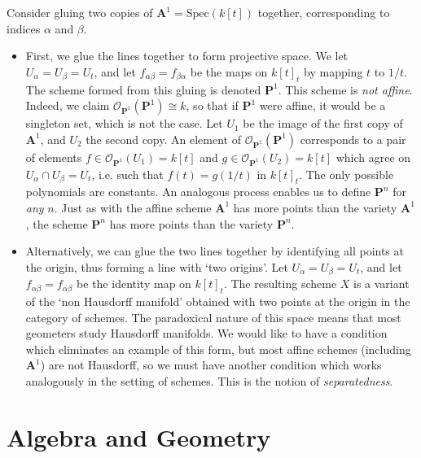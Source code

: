 \begin{example}
    Consider gluing two copies of $\mathbf{A}^1 = \text{Spec}(k[t])$ together, corresponding to indices $\alpha$ and $\beta$.
    \begin{itemize}
        \item First, we glue the lines together to form projective space. We let $U_\alpha = U_\beta = U_t$, and let $f_{\alpha \beta} = f_{\beta \alpha}$ be the maps on $k[t]_t$ by mapping $t$ to $1/t$. The scheme formed from this gluing is denoted $\mathbf{P}^1$. This scheme is \emph{not affine}. Indeed, we claim $\mathcal{O}_{\mathbf{P}^1}(\mathbf{P}^1) \cong k$, so that if $\mathbf{P}^1$ were affine, it would be a singleton set, which is not the case. Let $U_1$ be the image of the first copy of $\mathbf{A}^1$, and $U_2$ the second copy. An element of $\mathcal{O}_{\mathbf{P}^1}(\mathbf{P}^1)$ corresponds to a pair of elements $f \in \mathcal{O}_{\mathbf{P}^1}(U_1) = k[t]$ and $g \in \mathcal{O}_{\mathbf{P}^1}(U_2) = k[t]$ which agree on $U_\alpha \cap U_\beta = U_t$, i.e. such that $f(t) = g(1/t)$ in $k[t]_t$. The only possible polynomials are constants. An analogous process enables us to define $\mathbf{P}^n$ for \emph{any} $n$. Just as with the affine scheme $\mathbf{A}^1$ has more points than the variety $\mathbf{A}^1$, the scheme $\mathbf{P}^n$ has more points than the variety $\mathbf{P}^n$.

        \item Alternatively, we can glue the two lines together by identifying all points at the origin, thus forming a line with `two origins'. Let $U_\alpha = U_\beta = U_t$, and let $f_{\alpha \beta} = f_{\alpha \beta}$ be the identity map on $k[t]_t$. The resulting scheme $X$ is a variant of the `non Hausdorff manifold' obtained with two points at the origin in the category of schemes. The paradoxical nature of this space means that most geometers study Hausdorff manifolds. We would like to have a condition which eliminates an example of this form, but most affine schemes (including $\mathbf{A}^1$) are not Hausdorff, so we must have another condition which works analogously in the setting of schemes. This is the notion of \emph{separatedness}.
    \end{itemize}
\end{example}

\section{Algebra and Geometry}

